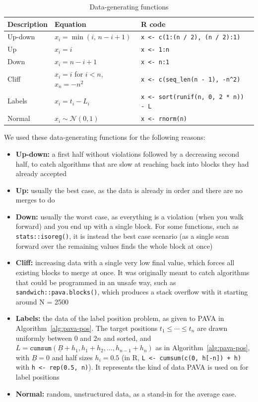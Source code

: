 \documentclass{article}
\begin{document}
\begin{table}[H]
    \centering
    \begin{tabular}{lll}
        \toprule
        Description & Equation & \textsf{R} code \\
        \midrule
        Up-down & $x_i = \min(i,\, n - i + 1)$                 & \verb|x <- c(1:(n / 2), (n / 2):1)| \\
        Up      & $x_i = i$                                    & \verb|x <- 1:n| \\
        Down    & $x_i = n - i + 1$                            & \verb|x <- n:1| \\
        Cliff   & $x_i = i$ for $i < n$, \; $x_n = -n^2$       & \verb|x <- c(seq_len(n - 1), -n^2)| \\
        Labels  & $x_i = t_i - L_i$                            & \verb|x <- sort(runif(n, 0, 2 * n)) - L| \\        Normal  & $x_i \sim \mathcal{N}(0, 1)$                 & \verb|x <- rnorm(n)| \\
        \bottomrule
    \end{tabular}
    \caption{Data-generating functions}
    \label{tab:generators}
\end{table}

We used these data-generating functions for the following reasons: 
\begin{itemize}
    \item \textbf{Up-down:} a first half without violations followed by a decreasing second half, to catch algorithms that are slow at reaching back into blocks they had already accepted
    \item \textbf{Up:} usually the best case, as the data is already in order and there are no merges to do
    \item \textbf{Down:} usually the worst case, as everything is a violation (when you walk forward) and you end up with a single block. For some functions, such as \texttt{stats::isoreg()}, it is instead the best case scenario (as a single scan forward over the remaining values finds the whole block at once)
    \item \textbf{Cliff:} increasing data with a single very low final value, which forces all existing blocks to merge at once. It was originally meant to catch algorithms that could be programmed in an unsafe way, such as \texttt{sandwich::pava.blocks()}, which produces a stack overflow with it starting around N = 2500
    \item \textbf{Labels:} the data of the label position problem, as given to PAVA in Algorithm~\ref{alg:pava-pos}. The target positions $t_1\leq\cdots\leq t_n$ are drawn uniformly between $0$ and $2n$ and sorted, and $L = \texttt{cumsum}(\allowbreak\underline B+h_1, h_1+h_2, \dots, h_{n-1}+h_n)$ as in Algorithm~\ref{alg:pava-pos}, with $\underline B = 0$ and half sizes $h_i = 0.5$ (in \textsf{R}, \verb|L <- cumsum(c(0, h[-n]) + h)| with \verb|h <- rep(0.5, n)|). It represents the kind of data PAVA is used on for label positions
    \item \textbf{Normal:} random, unstructured data, as a stand-in for the average case.
\end{itemize}
\end{document}
